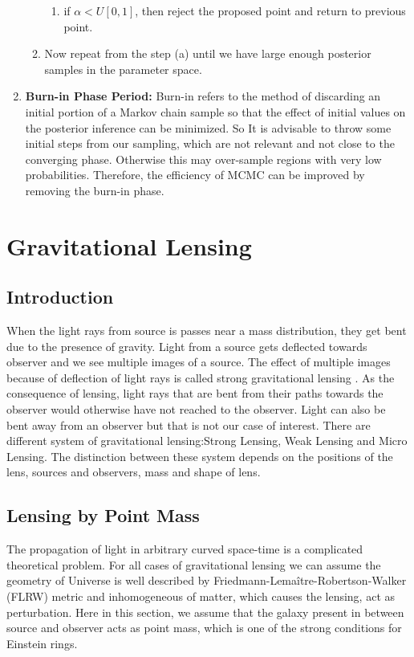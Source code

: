 \documentclass[12pt]{report}
\begin{document}
\begin{enumerate}
\begin{enumerate}
\begin{enumerate}
\item
if $\alpha<U[0,1]$, then reject the proposed point and return to previous point.
\end{enumerate}
\item
Now repeat from the step (a) until we have large enough posterior samples in the parameter space.
\end{enumerate}
\item
\textbf{Burn-in Phase Period:} Burn-in refers to the method of discarding an initial portion of a Markov chain sample so that the effect of initial values on the posterior inference can be  minimized.  So It is advisable to throw some initial steps from our sampling, which are not relevant and not close to the converging phase. Otherwise this may over-sample regions with very low probabilities. Therefore, the efficiency of MCMC can be improved by removing the burn-in phase. \\
\end{enumerate}
\chapter{Gravitational Lensing}
\section{Introduction}
When the light rays from source is passes near a mass distribution, they get bent due to the presence of gravity. Light from a source gets deflected towards observer and we see multiple images of a source. The effect of multiple images because of deflection of light rays is called strong gravitational lensing \cite{rn1996,sl1992}. As the consequence of lensing, light rays that are bent from their paths towards the observer would otherwise have not reached to the observer. Light can also be bent away from an observer but that is not our case of interest. There are different system of gravitational lensing:Strong Lensing, Weak Lensing and Micro Lensing. The distinction between these system depends on the positions of the lens, sources and observers, mass and shape of lens.
\section{Lensing by Point Mass}
The propagation of light in arbitrary curved space-time is a complicated theoretical problem. For all cases of gravitational lensing we can assume the geometry of Universe is well described by Friedmann-Lema\^itre-Robertson-Walker (FLRW) metric and inhomogeneous of matter, which causes the lensing, act as perturbation. Here in this section, we assume that the galaxy present in between source and observer acts as point mass, which is one of the strong conditions for Einstein rings.
\end{document}
